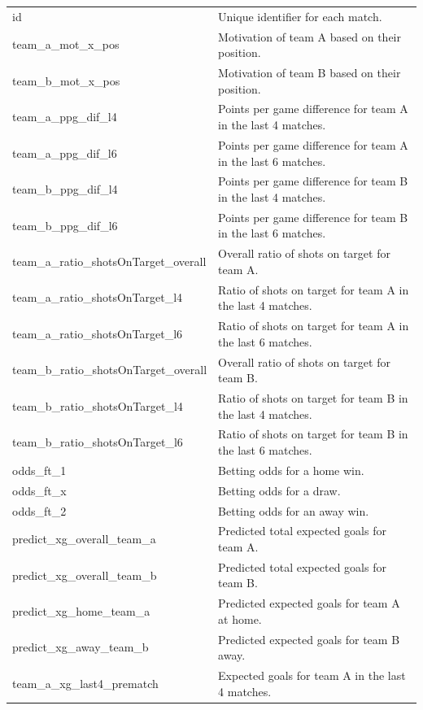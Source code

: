\documentclass[rgb,listoffigures,listoftables,final]{cam-thesis}
\begin{document}
\begin{center}
\begin{longtable}{ll}
        id & Unique identifier for each match. \\
        team\_a\_mot\_x\_pos & Motivation of team A based on their position. \\
        team\_b\_mot\_x\_pos & Motivation of team B based on their position. \\
        team\_a\_ppg\_dif\_l4 & Points per game difference for team A in the last 4 matches. \\
        team\_a\_ppg\_dif\_l6 & Points per game difference for team A in the last 6 matches. \\
        team\_b\_ppg\_dif\_l4 & Points per game difference for team B in the last 4 matches. \\
        team\_b\_ppg\_dif\_l6 & Points per game difference for team B in the last 6 matches. \\
        team\_a\_ratio\_shotsOnTarget\_overall & Overall ratio of shots on target for team A. \\
        team\_a\_ratio\_shotsOnTarget\_l4 & Ratio of shots on target for team A in the last 4 matches. \\
        team\_a\_ratio\_shotsOnTarget\_l6 & Ratio of shots on target for team A in the last 6 matches. \\
        team\_b\_ratio\_shotsOnTarget\_overall & Overall ratio of shots on target for team B. \\
        team\_b\_ratio\_shotsOnTarget\_l4 & Ratio of shots on target for team B in the last 4 matches. \\
        team\_b\_ratio\_shotsOnTarget\_l6 & Ratio of shots on target for team B in the last 6 matches. \\
        odds\_ft\_1 & Betting odds for a home win. \\
        odds\_ft\_x & Betting odds for a draw. \\
        odds\_ft\_2 & Betting odds for an away win. \\
        predict\_xg\_overall\_team\_a & Predicted total expected goals for team A. \\
        predict\_xg\_overall\_team\_b & Predicted total expected goals for team B. \\
        predict\_xg\_home\_team\_a & Predicted expected goals for team A at home. \\
        predict\_xg\_away\_team\_b & Predicted expected goals for team B away. \\
        team\_a\_xg\_last4\_prematch & Expected goals for team A in the last 4 matches. \\

\end{longtable}
\end{center}
\end{document}
